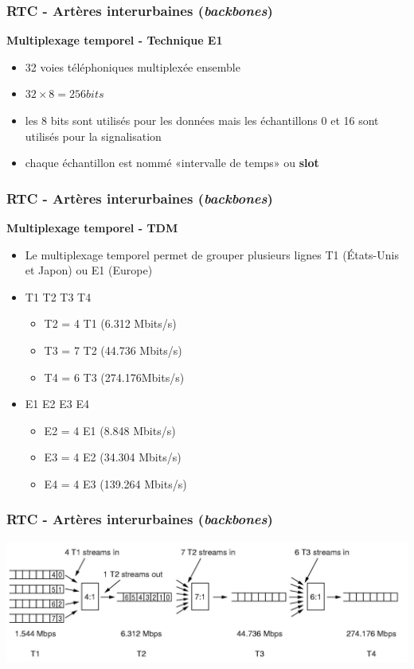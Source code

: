 \begin{frame}[fragile]
	\frametitle{RTC - Artères interurbaines (\textit{backbones})}
{\large\bf Multiplexage temporel - Technique E1}
\begin{itemize}
	\item 32 voies téléphoniques multiplexée ensemble
	\item $32\times 8 = 256 bits$
	\item les 8 bits sont utilisés pour les données mais les échantillons 0 et 16 
	sont utilisés pour la signalisation
	\item chaque échantillon est nommé «intervalle de temps» ou \textbf{slot}
\end{itemize}
\end{frame}

\begin{frame}[fragile]
  \frametitle{RTC - Artères interurbaines (\textit{backbones})}
{\large\bf Multiplexage temporel - TDM}
\begin{itemize}
	\item Le multiplexage temporel permet de grouper plusieurs lignes T1 (États-Unis et Japon) 
	ou E1 (Europe)
	\item T1 T2 T3 T4
	\begin{itemize}
		\item T2 = 4 T1 (6.312 Mbits/s)
		\item T3 = 7 T2 (44.736 Mbits/s)
		\item T4 = 6 T3 (274.176Mbits/s)
	\end{itemize}
	\item E1 E2 E3 E4
	\begin{itemize}
		\item E2 = 4 E1 (8.848 Mbits/s)
		\item E3 = 4 E2 (34.304 Mbits/s)
		\item E4 =  4 E3 (139.264 Mbits/s)
	\end{itemize}
\end{itemize}
\end{frame}

\begin{frame}[fragile]
	\frametitle{RTC - Artères interurbaines (\textit{backbones})}
\begin{center}
	\includegraphics[width=.9\linewidth]{img/2-28-old.jpg}
\end{center}
\end{frame}


